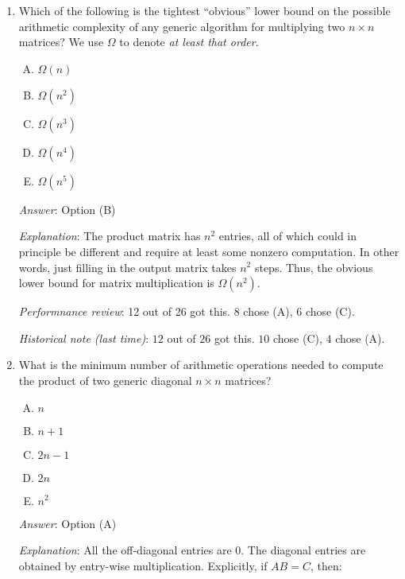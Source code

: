 \documentclass[10pt]{amsart}
\begin{document}
\begin{enumerate}
  {\em Answer}: Option (C)

  {\em Explanation}: Based on Question 1, where $m,n,p$ are all equal
  to $n$.

  {\em Performance review}: 23 out of 26 got this. 3 people
  chose (D).

  {\em Historical note (last time)}: $23$ out of $26$ got this. $2$
  chose (B), $1$ chose (D).
\item Which of the following is the tightest ``obvious'' lower bound
  on the possible arithmetic complexity of any generic algorithm for
  multiplying two $n \times n$ matrices? We use $\Omega$ to denote
  {\em at least that order}.

  \begin{enumerate}[(A)]
  \item $\Omega(n)$
  \item $\Omega(n^2)$
  \item $\Omega(n^3)$
  \item $\Omega(n^4)$
  \item $\Omega(n^5)$
  \end{enumerate}

  {\em Answer}: Option (B)

  {\em Explanation}: The product matrix has $n^2$ entries, all of
  which could in principle be different and require at least some
  nonzero computation. In other words, just filling in the output
  matrix takes $n^2$ steps. Thus, the obvious lower bound for matrix
  multiplication is $\Omega(n^2)$.

  {\em Performnance review}: 12 out of 26 got this. 8 chose
  (A), 6 chose (C).

  {\em Historical note (last time)}: $12$ out of $26$ got this. $10$
  chose (C), $4$ chose (A).
\item What is the minimum number of arithmetic operations needed to
  compute the product of two generic diagonal $n \times n$ matrices?

  \begin{enumerate}[(A)]
  \item $n$
  \item $n + 1$
  \item $2n - 1$
  \item $2n$
  \item $n^2$
  \end{enumerate}

  {\em Answer}: Option (A)

  {\em Explanation}: All the off-diagonal entries are $0$. The
  diagonal entries are obtained by entry-wise
  multiplication. Explicitly, if $AB = C$, then:


\end{enumerate}
\end{document}
